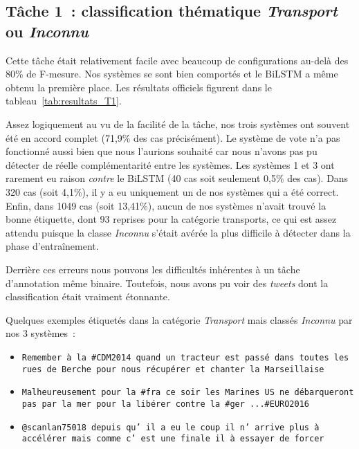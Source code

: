 \label{sec:resultats}

\subsection{Tâche 1~: classification  thématique \emph{Transport} ou \emph{Inconnu}}

Cette tâche était relativement facile avec beaucoup de configurations au-delà des 80\% de F-mesure.
Nos systèmes se sont bien comportés et le BiLSTM a même obtenu la première place.
Les résultats officiels figurent dans le tableau~\ref{tab:resultats_T1}.


Assez logiquement au vu de la facilité de la tâche, nos trois systèmes ont souvent été en accord complet (71,9\% des cas précisément).
Le système de vote n'a pas fonctionné aussi bien que nous l'aurions souhaité car nous n'avons pas pu détecter de réelle complémentarité entre les systèmes.
Les systèmes 1 et 3 ont rarement eu raison \emph{contre} le BiLSTM (40 cas soit seulement 0,5\% des cas).
Dans 320 cas (soit 4,1\%), il y a eu uniquement un de nos systèmes qui a été correct.
Enfin, dans 1049 cas (soit 13,41\%), aucun de nos systèmes n'avait trouvé la bonne étiquette, dont 93 reprises pour la catégorie transports, ce qui est assez attendu puisque la classe \emph{Inconnu} s'était avérée la plus difficile à détecter dans la phase d'entraînement.

Derrière ces erreurs nous pouvons les difficultés inhérentes à un tâche d'annotation même binaire.
Toutefois, nous avons pu voir des \textit{tweets} dont la classification était vraiment étonnante.

Quelques exemples étiquetés dans la catégorie \emph{Transport} mais classés \emph{Inconnu} par nos 3 systèmes~:
\begin{itemize}
\item \texttt{Remember à la \#CDM2014 quand un tracteur est passé dans toutes les rues de Berche pour nous récupérer et chanter la Marseillaise}
 \item \texttt{Malheureusement pour la \#fra ce soir les Marines US ne débarqueront pas par la mer pour la libérer contre la \#ger ...\#EURO2016}
 \item \texttt{@scanlan75018 depuis qu' il a eu le coup il n' arrive plus à accélérer mais comme c' est une finale il à essayer de forcer}
\end{itemize}

